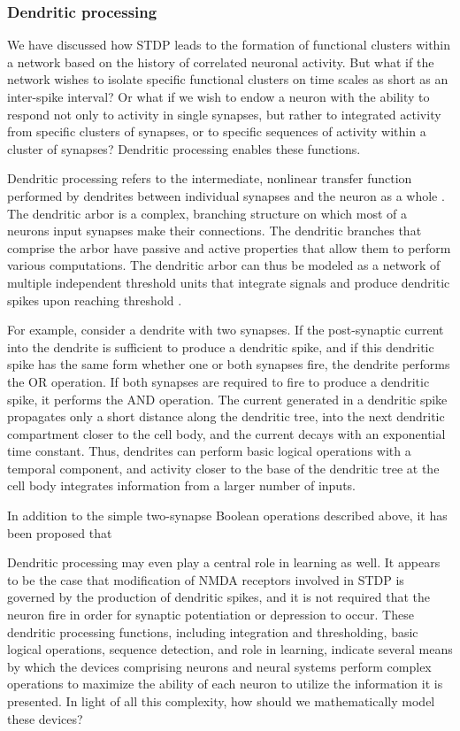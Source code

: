 \documentclass[twocolumn]{article}
\begin{document}
\subsubsection{Dendritic processing}
We have discussed how STDP leads to the formation of functional clusters within a network based on the history of correlated neuronal activity. But what if the network wishes to isolate specific functional clusters on time scales as short as an inter-spike interval? Or what if we wish to endow a neuron with the ability to respond not only to activity in single synapses, but rather to integrated activity from specific clusters of synapses, or to specific sequences of activity within a cluster of synapses? Dendritic processing enables these functions.

Dendritic processing refers to the intermediate, nonlinear transfer function performed by dendrites between individual synapses and the neuron as a whole \cite{stsp2015}. The dendritic arbor is a complex, branching structure on which most of a neurons input synapses make their connections. The dendritic branches that comprise the arbor have passive and active properties that allow them to perform various computations. The dendritic arbor can thus be modeled as a network of multiple independent threshold units that integrate signals and produce dendritic spikes upon reaching threshold \citep{sava2017}.

For example, consider a dendrite with two synapses. If the post-synaptic current into the dendrite is sufficient to produce a dendritic spike, and if this dendritic spike has the same form whether one or both synapses fire, the dendrite performs the OR operation. If both synapses are required to fire to produce a dendritic spike, it performs the AND operation. The current generated in a dendritic spike propagates only a short distance along the dendritic tree, into the next dendritic compartment closer to the cell body, and the current decays with an exponential time constant. Thus, dendrites can perform basic logical operations with a temporal component, and activity closer to the base of the dendritic tree at the cell body integrates information from a larger number of inputs. 

In addition to the simple two-synapse Boolean operations described above, it has been proposed that 

Dendritic processing may even play a central role in learning as well. It appears to be the case that modification of NMDA receptors involved in STDP is governed by the production of dendritic spikes, and it is not required that the neuron fire in order for synaptic potentiation or depression to occur. These dendritic processing functions, including integration and thresholding, basic logical operations, sequence detection, and role in learning, indicate several means by which the devices comprising neurons and neural systems perform complex operations to maximize the ability of each neuron to utilize the information it is presented. In light of all this complexity, how should we mathematically model these devices?
\end{document}
